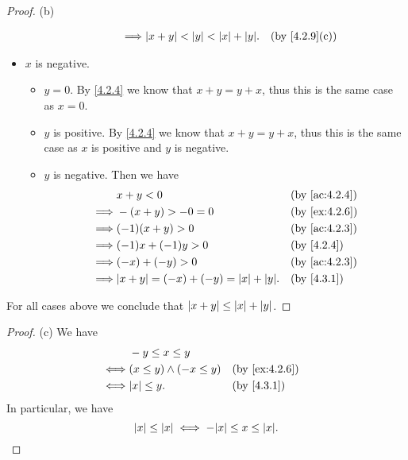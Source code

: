 \begin{proof}{(b)}
\begin{itemize}
\begin{itemize}
\begin{itemize}
\begin{align*}
                            \implies & \abs{x + y} < \abs{y} < \abs{x} + \abs{y}. &  & \text{(by \cref{4.2.9}(c))}
                          \end{align*}
                  \end{itemize}
          \end{itemize}
    \item \(x\) is negative.
          \begin{itemize}
            \item \(y = 0\).
                  By \cref{4.2.4} we know that \(x + y = y + x\), thus this is the same case as \(x = 0\).
            \item \(y\) is positive.
                  By \cref{4.2.4} we know that \(x + y = y + x\), thus this is the same case as \(x\) is positive and \(y\) is negative.
            \item \(y\) is negative.
                  Then we have
                  \begin{align*}
                             & x + y < 0                                      &  & \text{(by \cref{ac:4.2.4})} \\
                    \implies & -(x + y) > -0 = 0                              &  & \text{(by \cref{ex:4.2.6})} \\
                    \implies & (-1)(x + y) > 0                                &  & \text{(by \cref{ac:4.2.3})} \\
                    \implies & (-1)x + (-1)y > 0                              &  & \text{(by \cref{4.2.4})}    \\
                    \implies & (-x) + (-y) > 0                                &  & \text{(by \cref{ac:4.2.3})} \\
                    \implies & \abs{x + y} = (-x) + (-y) = \abs{x} + \abs{y}. &  & \text{(by \cref{4.3.1})}
                  \end{align*}
          \end{itemize}
  \end{itemize}
  For all cases above we conclude that \(\left\lvert x + y\right\rvert \leq \left\lvert x\right\rvert + \left\lvert y\right\rvert\).
\end{proof}

\begin{proof}{(c)}
  We have
  \begin{align*}
         & -y \leq x \leq y                                              \\
    \iff & (x \leq y) \land (-x \leq y) &  & \text{(by \cref{ex:4.2.6})} \\
    \iff & \abs{x} \leq y.              &  & \text{(by \cref{4.3.1})}
  \end{align*}
  In particular, we have
  \[
    \abs{x} \leq \abs{x} \iff -\abs{x} \leq x \leq \abs{x}.
  \]
\end{proof}

